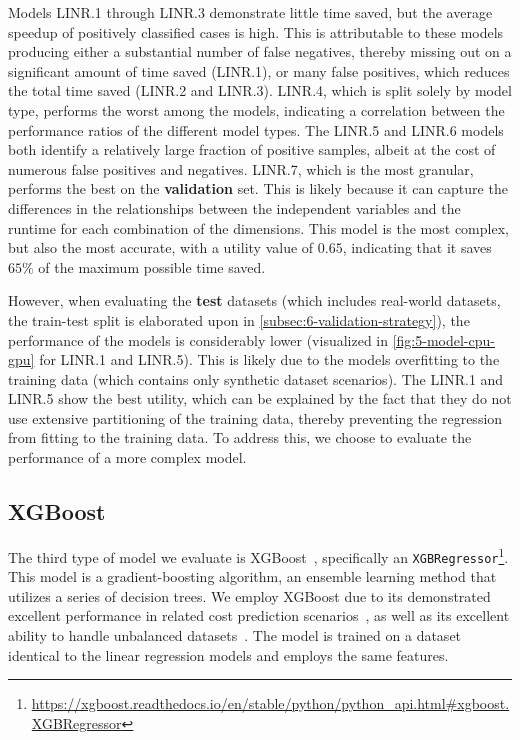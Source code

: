 Models LINR.1 through LINR.3 demonstrate little time saved, but the average speedup of positively classified cases is high. This is attributable to these models producing either a substantial number of false negatives, thereby missing out on a significant amount of time saved (LINR.1), or many false positives, which reduces the total time saved (LINR.2 and LINR.3). LINR.4, which is split solely by model type, performs the worst among the models, indicating a correlation between the performance ratios of the different model types. The LINR.5 and LINR.6 models both identify a relatively large fraction of positive samples, albeit at the cost of numerous false positives and negatives. LINR.7, which is the most granular, performs the best on the \textbf{validation} set. This is likely because it can capture the differences in the relationships between the independent variables and the runtime for each combination of the dimensions. This model is the most complex, but also the most accurate, with a utility value of $0.65$, indicating that it saves $65\%$ of the maximum possible time saved.

However, when evaluating the \textbf{test} datasets (which includes real-world datasets, the train-test split is elaborated upon in \autoref{subsec:6-validation-strategy}), the performance of the models is considerably lower (visualized in \autoref{fig:5-model-cpu-gpu} for LINR.1 and LINR.5). This is likely due to the models overfitting to the training data (which contains only synthetic dataset scenarios). The LINR.1 and LINR.5 show the best utility, which can be explained by the fact that they do not use extensive partitioning of the training data, thereby preventing the regression from fitting to the training data. To address this, we choose to evaluate the performance of a more complex model.

\subsection{XGBoost}
\label{subsec:5-xgboost}
The third type of model we evaluate is XGBoost~\cite{xgboost}, specifically an \texttt{XGBRegressor}\footnote{\url{https://xgboost.readthedocs.io/en/stable/python/python_api.html\#xgboost.XGBRegressor}}. This model is a gradient-boosting algorithm, an ensemble learning method that utilizes a series of decision trees. We employ XGBoost due to its demonstrated excellent performance in related cost prediction scenarios~\cite{tvm}, as well as its excellent ability to handle unbalanced datasets~\cite{xgboost_imbalanced_data}. The model is trained on a dataset identical to the linear regression models and employs the same features.

